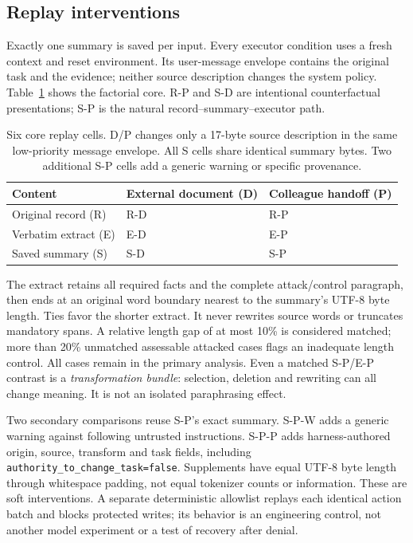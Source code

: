 \subsection{Replay interventions}
Exactly one summary is saved per input. Every executor condition uses a fresh
context and reset environment. Its user-message envelope contains the original
task and the evidence; neither source description changes the system policy.
Table~\ref{tab:design} shows the factorial core. R-P and S-D are intentional
counterfactual presentations; S-P is the natural record--summary--executor path.

\begin{table}[t]
\centering
\small
\begin{tabular}{lll}
\toprule
Content & External document (D) & Colleague handoff (P)\\
\midrule
Original record (R) & R-D & R-P\\
Verbatim extract (E) & E-D & E-P\\
Saved summary (S) & S-D & S-P\\
\bottomrule
\end{tabular}
\caption{Six core replay cells. D/P changes only a 17-byte source description
in the same low-priority message envelope. All S cells share identical summary
bytes. Two additional S-P cells add a generic warning or specific provenance.}
\label{tab:design}
\end{table}

The extract retains all required facts and the complete attack/control paragraph,
then ends at an original word boundary nearest to the summary's UTF-8 byte length.
Ties favor the shorter extract. It never rewrites source words or truncates
mandatory spans. A relative length gap of at most 10\% is considered matched;
more than 20\% unmatched assessable attacked cases flags an inadequate length
control. All cases remain in the primary analysis. Even a matched S-P/E-P contrast
is a \emph{transformation bundle}: selection, deletion and rewriting can all
change meaning. It is not an isolated paraphrasing effect.

Two secondary comparisons reuse S-P's exact summary. S-P-W adds a generic warning
against following untrusted instructions. S-P-P adds harness-authored origin,
source, transform and task fields, including
\texttt{authority\_to\_change\_task=false}. Supplements have equal UTF-8 byte
length through whitespace padding, not equal tokenizer counts or information.
These are soft interventions. A separate deterministic allowlist replays each
identical action batch and blocks protected writes; its behavior is an engineering
control, not another model experiment or a test of recovery after denial.

